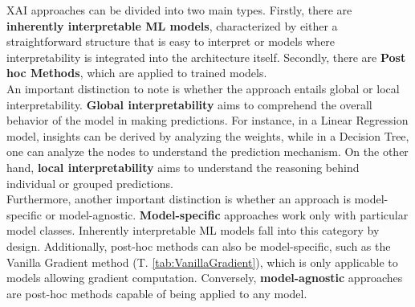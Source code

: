 XAI approaches can be divided into two main types. Firstly, there are \textbf{inherently interpretable ML models}, characterized by either a straightforward structure that is easy to interpret or models where interpretability is integrated into the architecture itself. Secondly, there are \textbf{Post hoc Methods}, which are applied to trained models. \\
An important distinction to note is whether the approach entails global or local interpretability. \textbf{Global interpretability} aims to comprehend the overall behavior of the model in making predictions. For instance, in a Linear Regression model, insights can be derived by analyzing the weights, while in a Decision Tree, one can analyze the nodes to understand the prediction mechanism. On the other hand, \textbf{local interpretability} aims to understand the reasoning behind individual or grouped predictions. \\
Furthermore, another important distinction is whether an approach is model-specific or model-agnostic. \textbf{Model-specific} approaches work only with particular model classes. Inherently interpretable ML models fall into this category by design. Additionally, post-hoc methods can also be model-specific, such as the Vanilla Gradient method (T. \ref{tab:VanillaGradient}), which is only applicable to models allowing gradient computation.
Conversely, \textbf{model-agnostic} approaches are post-hoc methods capable of being applied to any model.
